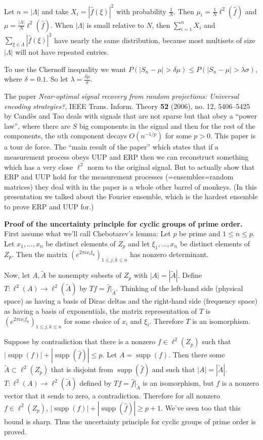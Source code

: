 \documentclass{article}
\DeclareMathOperator{\supp}{supp}
\begin{document}
Let $n=|\Lambda|$ and take $X_i=|\hat{f}(\xi)|^2$ with probability $\frac{1}{N}$. Then
$\mu_i=\frac{1}{N}\ell^2(\hat{f})$ and $\mu=\frac{|\Lambda|}{N}\ell^2(\hat{f})$.
When $|\Lambda|$ is small relative to $N$, then $\sum_{i=1}^n X_i$ and
$\sum_{\xi \in \Lambda}|\hat{f}(\xi)|^2$ have nearly the same distribution,
because most multisets of size $|\Lambda|$ will not have repeated entries.

To use the Chernoff inequality we want $P(|S_n-\mu|>\delta \mu) \leq
P(|S_n-\mu| > \lambda \sigma)$, where $\delta=0.1$. So let $\lambda=\frac{\delta \mu}{\sigma}$.

The paper {\em Near-optimal signal recovery from random projections:
Universal encoding strategies?}, IEEE Trans. Inform. Theory \textbf{52}
(2006), no. 12, 5406--5425 by Cand\`es and Tao deals with signals that
are not sparse but that obey a ``power law'', where there are $S$ big
components in the signal and then for the rest of the components, the $n$th
component decays $O(n^{-1/p})$ for some $p>0$. This paper
is a tour de force. The ``main result of the paper'' which states
that if a measurement process obeys UUP and ERP then
we can reconstruct something which has a very close $\ell^2$ norm to
the original signal. But to actually show that ERP and UUP hold for
the measurement processes (=ensembles=random matrices) they deal with in
the paper is a whole other barrel of monkeys.
(In this presentation we talked about the Fourier ensemble, which
is the hardest ensemble to prove ERP and UUP for.)

\textbf{Proof of the uncertainty principle for cyclic groups
of prime order.} First assume what we'll call Chebotarev's lemma:
Let $p$ be prime and $1 \leq n \leq p$. Let $x_1,\ldots,x_n$ be distinct
elements of $Z_p$ and let $\xi_1,\ldots,x_n$ be distinct elements of
$Z_p$. Then the matrix $(e^{2\pi i x_i \xi_k})_{1 \leq j,k\leq n}$
has nonzero determinant.

Now, let $A,\tilde{A}$ be nonempty subsets of $Z_p$ with $|A|=|\tilde{A}|$.
Define $T:\ell^2(A) \to \ell^2(\tilde{A})$ by
$Tf=\hat{f}|_{\tilde{A}}$. Thinking of the left-hand side (physical space)
as having a basis of Dirac deltas and the right-hand side (frequency space)
as having a basis of exponentials, the matrix representation of $T$
is $(e^{2\pi i x_i \xi_k})_{1 \leq j,k\leq n}$ for some choice of
$x_i$ and $\xi_i$. Therefore $T$ is an isomorphism.

Suppose by contradiction that there is a nonzero $f \in \ell^2(Z_p)$
such that $|\supp(f)|+|\supp(\hat{f})| \leq p$. Let $A=\supp(f)$.
Then there some $\tilde{A} \subset \ell^2(Z_p)$ that is disjoint from
$\supp(\hat{f})$ and such that $|A|=|\tilde{A}|$. $T:\ell^2(A) \to
\ell^2(\tilde{A})$ defined by $Tf=\hat{f}|_{\tilde{A}}$ is an isomorphism,
but $f$ is a nonzero vector that it sends to zero, a contradiction. Therefore
for all nonzero $f \in \ell^2(Z_p)$, $|\supp(f)|+|\supp(\hat{f})| \geq p+1$.
We've seen too that this bound is sharp.
Thus the uncertainty principle for cyclic groups of prime order is proved.
\end{document}
